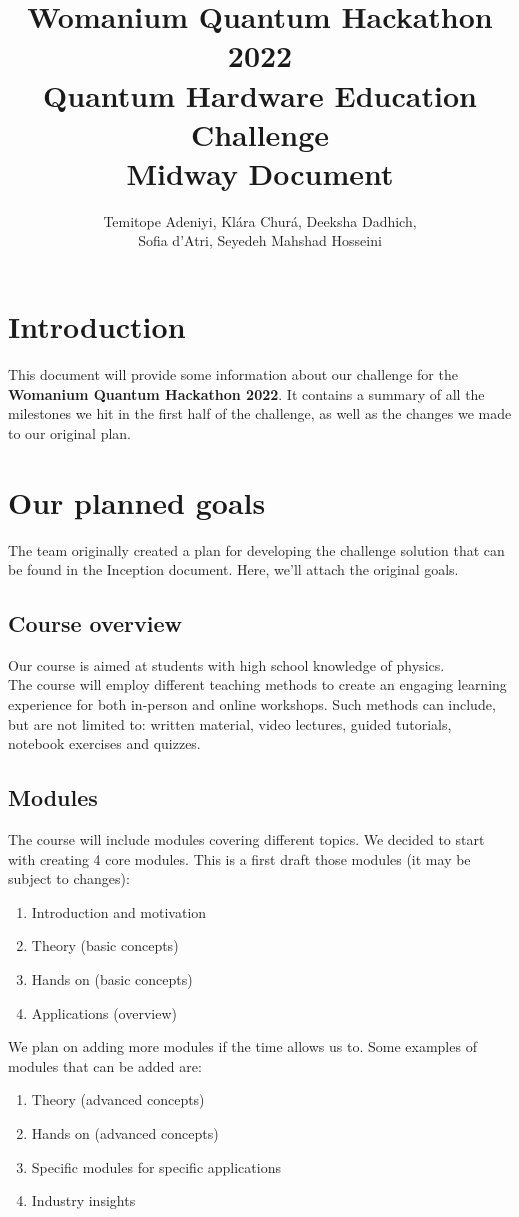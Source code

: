 \documentclass[hidelinks, a4paper,12pt]{article}
\title{Womanium Quantum Hackathon 2022\\Quantum Hardware Education Challenge\\Midway Document}
\author{Temitope Adeniyi, Klára Churá, Deeksha Dadhich,\\Sofia d'Atri, Seyedeh Mahshad Hosseini}
\date{}
\begin{document}
\maketitle

\tableofcontents


\section{Introduction}
This document will provide some information about our challenge for the \textbf{Womanium Quantum Hackathon 2022}. It contains a summary of all the milestones we hit in the first half of the challenge, as well as the changes we made to our original plan.
\newpage
\section{Our planned goals}
The team originally created a plan for developing the challenge solution that can be found in the Inception document. Here, we'll attach the original goals.

\subsection{Course overview}
Our course is aimed at students with high school knowledge of physics.\\The course will employ different teaching methods to create an engaging learning experience for both in-person and online workshops. Such methods can include, but are not limited to: written material, video lectures, guided tutorials, notebook exercises and quizzes.
\subsection{Modules}
The course will include modules covering different topics. We decided to start with creating 4 core modules. This is a first draft those modules (it may be subject to changes):
\begin{enumerate}
  \item Introduction and motivation
  \item Theory (basic concepts)
  \item Hands on (basic concepts)
  \item Applications (overview)
\end{enumerate}
We plan on adding more modules if the time allows us to. Some examples of modules that can be added are:
\begin{enumerate}
  \item Theory (advanced concepts)
  \item Hands on (advanced concepts)
  \item Specific modules for specific applications
  \item Industry insights
\end{enumerate}
\end{document}
